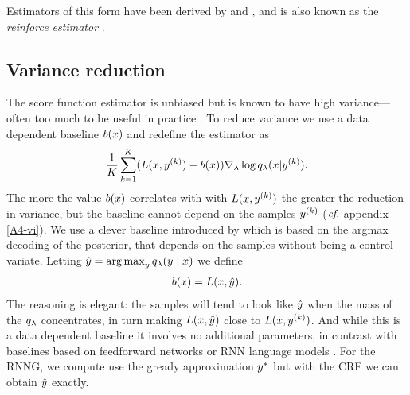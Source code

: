     Estimators of this form have been derived by \citet{williams1992reinforce,paisley2012viss,mnih2014nvil,ranganath2014black,mnih2016variational} and \citet{miao2016discrete}, and is also known as the \textit{reinforce estimator} \citep{williams1992reinforce}.

  \subsection{Variance reduction}
    The score function estimator is unbiased but is known to have high variance---often too much to be useful in practice  \citep{paisley2012viss}. To reduce variance we use a data dependent baseline $b(x)$ and redefine the estimator as
    \begin{align}
      \frac{1}{K}\sum_{k=1}^K  (L(x, y^{(k)}) - b(x))\nabla_{\lambda} \log q_{\lambda}(x | y^{(k)}).
    \end{align}
    The more the value $b(x)$ correlates with with $L(x, y^{(k)})$ the greater the reduction in variance, but the baseline cannot depend on the samples $y^{(k)}$ ($\emph{cf.}$ appendix \ref{A4-vi}). We use a clever baseline introduced by \citet{rennie2017argmax} which is based on the argmax decoding of the posterior, that  depends on the samples without being a control variate. Letting $\hat{y} = \operatorname*{arg\,max}_y q_{\lambda}(y \mid x)$ we define
    \begin{align}
      b(x) = L(x, \hat{y}).
    \end{align}
    The reasoning is elegant: the samples will tend to look like $\hat{y}$ when the mass of the $q_{\lambda}$ concentrates, in turn making $L(x, \hat{y})$ close to $L(x, y^{(k)})$. And while this is a data dependent baseline it involves no additional parameters, in contrast with baselines based on feedforward networks \citep{mnih2014nvil, miao2016discrete} or RNN language models \citep{yin2018structvae}. For the RNNG, we compute use the gready approximation $y^*$ but with the CRF we can obtain $\hat{y}$ exactly.

